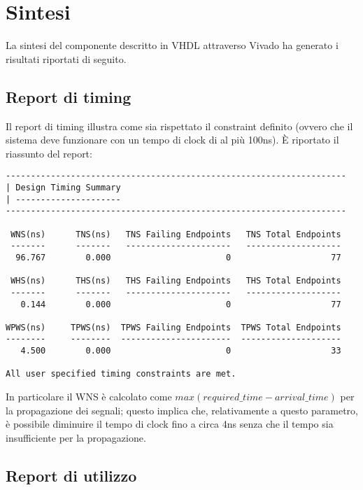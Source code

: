 
\section{Sintesi}

La sintesi del componente descritto in VHDL attraverso Vivado ha generato i risultati riportati di seguito.

\subsection{Report di timing}
Il report di timing illustra come sia rispettato il constraint definito (ovvero che il sistema deve funzionare con un tempo di clock di al pi\`u 100ns). \`E riportato il riassunto del report:
\begin{verbatim}
--------------------------------------------------------------------
| Design Timing Summary
| ---------------------
--------------------------------------------------------------------

 WNS(ns)      TNS(ns)   TNS Failing Endpoints   TNS Total Endpoints       
 -------      -------   ---------------------   -------------------        
  96.767        0.000                       0                    77      

 WHS(ns)      THS(ns)   THS Failing Endpoints   THS Total Endpoints     
 -------      -------   ---------------------   -------------------     
   0.144        0.000                       0                    77  

WPWS(ns)     TPWS(ns)  TPWS Failing Endpoints  TPWS Total Endpoints
--------     --------  ----------------------  --------------------
   4.500        0.000                       0                    33

All user specified timing constraints are met.
\end{verbatim}

In particolare il WNS \`e calcolato come $max(required\_time - arrival\_time)$ per la propagazione dei segnali; questo implica che, relativamente a questo parametro, \`e possibile diminuire il tempo di clock fino a circa 4ns senza che il tempo sia insufficiente per la propagazione.

\newpage

\subsection{Report di utilizzo}

